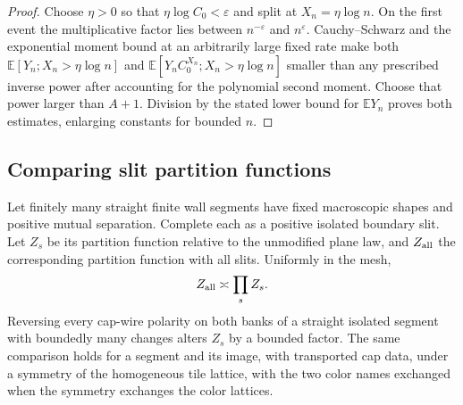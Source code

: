 \begin{proof}
Choose $\eta>0$ so that $\eta\log C_0<\varepsilon$ and split at
$X_n=\eta\log n$. On the first event the multiplicative factor lies
between $n^{-\varepsilon}$ and $n^{\varepsilon}$. Cauchy--Schwarz
and the exponential moment bound at an arbitrarily large fixed rate make
both $\mathbb E[Y_n;X_n>\eta\log n]$ and
$\mathbb E[Y_n C_0^{X_n};X_n>\eta\log n]$ smaller than any prescribed
inverse power after accounting for the polynomial second moment.
Choose that power larger than $A+1$. Division by the stated lower bound
for $\mathbb E Y_n$ proves both estimates, enlarging constants for
bounded $n$.
\end{proof}

\subsection{Comparing slit partition functions}

\begin{lemma}\label{prelim:surface}
Let finitely many straight finite wall segments have fixed macroscopic
shapes and positive mutual separation. Complete each as a positive
isolated boundary slit. Let $Z_s$ be its partition function relative to
the unmodified plane law, and $Z_{\rm all}$ the corresponding partition
function with all slits. Uniformly in the mesh,
\begin{equation}\label{prelim:surface-factorization}
 Z_{\rm all}\asymp\prod_s Z_s.
\end{equation}
Reversing every cap-wire polarity on both banks of a straight isolated
segment with boundedly many changes alters $Z_s$ by a bounded factor.
The same comparison holds for a segment and its image, with transported
cap data, under a symmetry of the homogeneous tile lattice, with the two
color names exchanged when the symmetry exchanges the color lattices.
\end{lemma}

